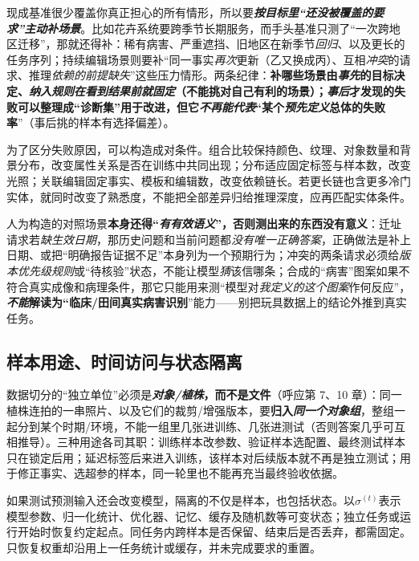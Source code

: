 现成基准很少覆盖你真正担心的所有情形，所以要\textbf{\emph{按目标里“还没被覆盖的要求”\emph{主动补场景}}}。比如花卉系统要跨季节长期服务，而手头基准只测了“一次跨地区迁移”，那就还得补：稀有病害、严重遮挡、旧地区在新季节\emph{回归}、以及更长的任务序列；持续编辑场景则要补“同一事实\emph{再次}更新（乙又换成丙）、互相\emph{冲突}的请求、推理\emph{依赖的前提缺失}”这些压力情形。两条纪律：\textbf{补哪些场景由\emph{事先}的目标决定、\emph{纳入规则在看到结果前就\emph{固定}}（不能挑对自己有利的场景）；\emph{事后}才发现的失败可以整理成“诊断集”用于改进，但它\emph{不再能代表}“某个\emph{预先定义}总体的失败率}”（事后挑的样本有选择偏差）。

为了区分失败原因，可以构造成对条件。组合比较保持颜色、纹理、对象数量和背景分布，改变属性关系是否在训练中共同出现；分布适应固定标签与样本数，改变光照；关联编辑固定事实、模板和编辑数，改变依赖链长。若更长链也含更多冷门实体，就同时改变了熟悉度，不能把全部差异归给推理深度，应再匹配实体条件。

人为构造的对照场景\textbf{本身还得“\emph{有\emph{有效}语义}”，否则测出来的东西没有意义}：迁址请求若\emph{缺生效日期}，那历史问题和当前问题都\emph{没有唯一正确答案}，正确做法是补上日期、或把“明确报告证据不足”本身列为一个预期行为；冲突的两条请求必须给\emph{版本优先级规则}或“待核验”状态，不能让模型\emph{猜}该信哪条；合成的“病害”图案如果不符合真实成像和病理条件，那它只能用来测“模型对\emph{我定义的这个图案}作何反应”，\textbf{\emph{不能}解读为“临床/田间真实病害识别}”能力——别把玩具数据上的结论外推到真实任务。

\subsection{样本用途、时间访问与状态隔离}
\label{sec:ket-evolution-evaluation-access}

数据切分的“独立单位”必须是\textbf{\emph{对象/植株}，而不是文件}（呼应第 7、10 章）：同一植株连拍的一串照片、以及它们的裁剪/增强版本，要\textbf{归入\emph{同一个对象组}}，整组一起分到某个时期/环境，不能一组里几张进训练、几张进测试（否则答案几乎可互相推导）。三种用途各司其职：训练样本改参数、验证样本选配置、最终测试样本只在锁定后用；延迟标签后来进入训练，该样本对后续版本就不再是独立测试；用于修正事实、选超参的样本，同一轮里也不能再充当最终验收依据。

如果测试预测输入还会改变模型，隔离的不仅是样本，也包括状态。以$\sigma^{(t)}$表示模型参数、归一化统计、优化器、记忆、缓存及随机数等可变状态；独立任务或运行开始时恢复约定起点。同任务内跨样本是否保留、结束后是否丢弃，都需固定。只恢复权重却沿用上一任务统计或缓存，并未完成要求的重置。

